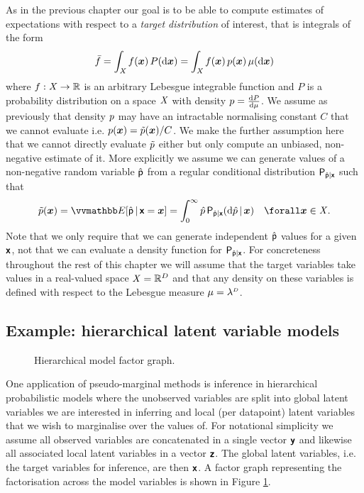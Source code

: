 As in the previous chapter our goal is to be able to compute estimates of expectations with respect to a \emph{target distribution} of interest, that is integrals of the form
\begin{equation}
  \bar{f} = \int_{\mathit{X}} f(\boldsymbol{x})\,P(\mathrm{d} \boldsymbol{x}) = \int_{\mathit{X}} f(\boldsymbol{x})\,p(\boldsymbol{x})\,\mu(\mathrm{d}\boldsymbol{x})
\end{equation}
where $f : \mathit{X} \to \mathbb{R}$ is an arbitrary Lebesgue integrable function and $P$ is a probability distribution on a space $\mathit{X}$ with density $p = \frac{\mathrm{d} P}{\mathrm{d} \mu}$. We assume as previously that density $p$ may have an intractable normalising constant $C$ that we cannot evaluate i.e. $p(\boldsymbol{x}) = \tilde{p}(\boldsymbol{x}) / C$. We make the further assumption here that we cannot directly evaluate $\tilde{p}$ either but only compute an unbiased, non-negative estimate of it. More explicitly we assume we can generate values of a non-negative random variable $\hat{\mathsf{p}}$ from a regular conditional distribution $\mathsf{P}_{\hat{\mathsf{p}}|\boldsymbol{\mathsf{x}}}$ such that
\begin{equation}\label{eq:pm-density-unbiased-estimator}
  \utgtdens(\vct{x}) = \expc{ \hat{\rvar{p}} \gvn \rvct{x} = \vct{x}}
  = \int_{0}^{\infty} \hat{p} \, \prob{\hat{\rvar{p}}|\rvct{x}}(\dr\hat{p}\gvn\vct{x})
  \quad \forall \vct{x} \in \set{X}.
\end{equation}
Note that we only require that we can generate independent $\hat{\mathsf{p}}$ values for a given $\boldsymbol{\mathsf{x}}$, not that we can evaluate a  density function for $\mathsf{P}_{\hat{\mathsf{p}}|\boldsymbol{\mathsf{x}}}$. For concreteness throughout the rest of this chapter we will assume that the target variables take values in a real-valued space $\mathit{X} = \mathbb{R}^D$ and that any density on these variables is defined with respect to the Lebesgue measure $\mu = \lebm{D}$.

\subsection{Example: hierarchical latent variable models}

\begin{figure}[!t]
\centering
{}
\caption{Hierarchical model factor graph.}
\label{fig:global-local-latent-variable-model}
\end{figure}

One application of pseudo-marginal methods is inference in hierarchical probabilistic models where the unobserved variables are split into global latent variables we are interested in inferring and local (per datapoint) latent variables that we wish to marginalise over the values of. For notational simplicity we assume all observed variables are concatenated in a single vector $\boldsymbol{\mathsf{y}}$ and likewise all associated local latent variables in a vector $\boldsymbol{\mathsf{z}}$. The global latent variables, i.e. the target variables for inference, are then $\boldsymbol{\mathsf{x}}$. A factor graph representing the factorisation across the model variables is shown in Figure \ref{fig:global-local-latent-variable-model}.

